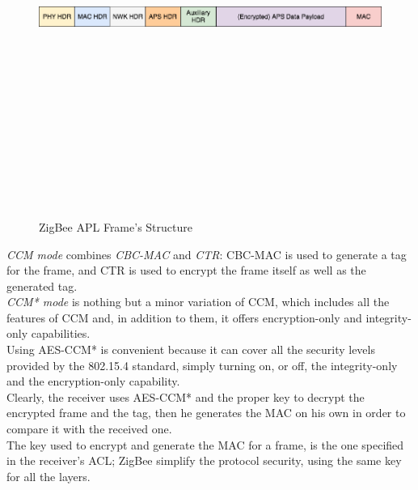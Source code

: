 \documentclass[12pt]{report}
\begin{document}
\begin{figure}[H]
\includegraphics[width=13cm,height=13cm,keepaspectratio]{aps_frame}
\centering
\caption{ZigBee APL Frame's Structure}
\label{fig:zigbeeapsframestruc}
\end{figure}


\emph{CCM mode} combines \emph{CBC-MAC} and \emph{CTR}: CBC-MAC is used to generate a tag for the frame, and CTR is used to encrypt the frame itself as well as the generated tag.\\
\emph{CCM* mode} is nothing but a minor variation of CCM, which includes all the features of CCM and, in addition to them, it offers encryption-only and integrity-only capabilities.\\
Using AES-CCM* is convenient because it can cover all the security levels provided by the 802.15.4 standard, simply turning on, or off, the integrity-only and the encryption-only capability.\\

Clearly, the receiver uses AES-CCM* and the proper key to decrypt the encrypted frame and the tag, then he generates the MAC on his own in order to compare it with the received one.\\
The key used to encrypt and generate the MAC for a frame, is the one specified in the receiver's ACL; ZigBee simplify the protocol security, using the same key for all the layers.\\
\end{document}
